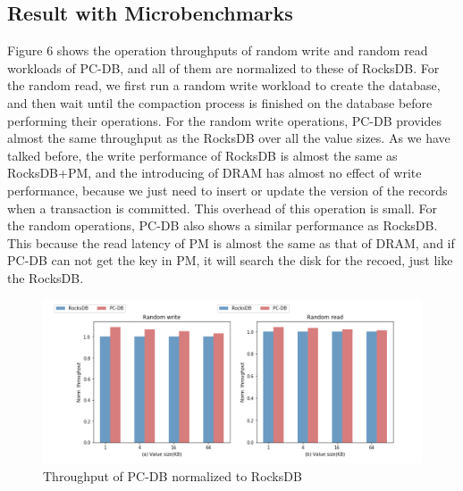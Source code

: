 \subsection{Result with Microbenchmarks}
Figure 6 shows the operation throughputs of random write and random read workloads of PC-DB, and all of them are normalized to these of RocksDB.  For the random read, we first run a random write workload to create the database, and then wait until the compaction process is finished on the database before performing their operations.
For the random write operations, PC-DB provides almost the same throughput as the RocksDB over all the value sizes. As we have talked before, the write performance of RocksDB is almost the same as RocksDB+PM, and the introducing of DRAM has almost no effect of write performance, because we just need to insert or update the version of the records when a transaction is committed. This overhead of this operation is small. 
For the random operations, PC-DB also shows a similar performance as RocksDB. This because the read latency of PM is almost the same as that of DRAM, and if PC-DB can not get the key in PM, it will search the disk for the recoed, just like the RocksDB.
\begin{figure}
    \centering
    \includegraphics[width=0.36\paperwidth]{figure/Throughput.png}
    \caption{Throughput of PC-DB normalized to RocksDB}
    \label{fig:throughput}
\end{figure}
